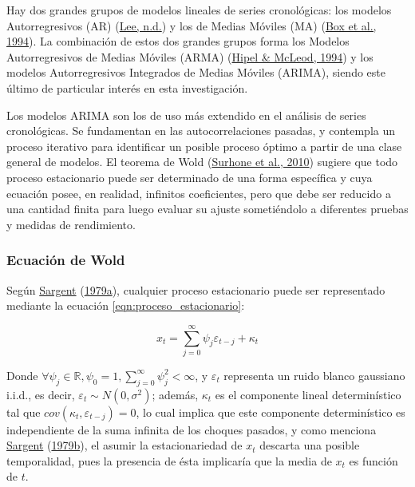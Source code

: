 \documentclass[
]{article}
\begin{document}
Hay dos grandes grupos de modelos lineales de series cronológicas: los
modelos Autorregresivos (AR) (\protect\hyperlink{ref-Lee}{Lee, n.d.}) y
los de Medias Móviles (MA) (\protect\hyperlink{ref-box-jenkins}{Box et
al., 1994}). La combinación de estos dos grandes grupos forma los
Modelos Autorregresivos de Medias Móviles (ARMA)
(\protect\hyperlink{ref-Hipel}{Hipel \& McLeod, 1994}) y los modelos
Autorregresivos Integrados de Medias Móviles (ARIMA), siendo este último
de particular interés en esta investigación.

Los modelos ARIMA son los de uso más extendido en el análisis de series
cronológicas. Se fundamentan en las autocorrelaciones pasadas, y
contempla un proceso iterativo para identificar un posible proceso
óptimo a partir de una clase general de modelos. El teorema de Wold
(\protect\hyperlink{ref-Wold}{Surhone et al., 2010}) sugiere que todo
proceso estacionario puede ser determinado de una forma específica y
cuya ecuación posee, en realidad, infinitos coeficientes, pero que debe
ser reducido a una cantidad finita para luego evaluar su ajuste
sometiéndolo a diferentes pruebas y medidas de rendimiento.

\subsubsection{Ecuación de Wold}

Según \protect\hyperlink{ref-sargent_macro}{Sargent}
(\protect\hyperlink{ref-sargent_macro}{1979a}), cualquier proceso
estacionario puede ser representado mediante la ecuación
\eqref{eqn:proceso_estacionario}:

\begin{equation}
\label{eqn:proceso_estacionario}
x_t=\sum_{j=0}^{\infty} \psi_j\varepsilon_{t-j}+\kappa_t
\end{equation}

Donde
\(\forall \psi_j \in \mathbb{R}, \psi_0=1, \sum_{j=0}^{\infty} \psi_j^2<\infty\),
y \(\varepsilon_t\) representa un ruido blanco gaussiano i.i.d., es
decir, \(\varepsilon_t \sim N(0, \sigma^2)\); además, \(\kappa_t\) es el
componente lineal determinístico tal que
\(cov(\kappa_t,\varepsilon_{t-j})=0\), lo cual implica que este
componente determinístico es independiente de la suma infinita de los
choques pasados, y como menciona
\protect\hyperlink{ref-sargent_kappa}{Sargent}
(\protect\hyperlink{ref-sargent_kappa}{1979b}), el asumir la
estacionariedad de \(x_t\) descarta una posible temporalidad, pues la
presencia de ésta implicaría que la media de \(x_t\) es función de
\(t\).
\end{document}
